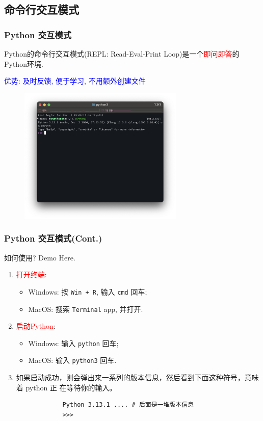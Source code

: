 \documentclass[handout]{ctexbeamer}
\begin{document}
        \subsection{命令行交互模式}
        \begin{frame}
            \frametitle{Python 交互模式}
            Python的命令行交互模式(REPL: Read-Eval-Print Loop)是一个\textcolor{red}{即问即答}的Python环境. 

            \textcolor{blue}{优势: 及时反馈, 便于学习, 不用额外创建文件}
            \begin{figure}[htpb]
                \centering
                \includegraphics[width=0.7\textwidth]{./images/terminal.png}
            \end{figure}
        \end{frame}

        \begin{frame}[fragile]
            \frametitle{Python 交互模式(Cont.)}
            如何使用? Demo Here.
            \begin{enumerate}
                \item \textcolor{red}{打开终端}:
                \begin{itemize}
                    \item Windows: 按 \texttt{Win + R}, 输入 \texttt{cmd} 回车;
                    \item MacOS: 搜索 \texttt{Terminal} app, 并打开.
                \end{itemize}  
                \item \textcolor{red}{启动Python}: 
                \begin{itemize}
                    \item Windows: 输入 \texttt{python} 回车;
                    \item MacOS: 输入 \texttt{python3} 回车.
                \end{itemize}
                \item 如果启动成功，则会弹出来一系列的版本信息，然后看到下面这种符号，意味着 python 正
                在等待你的输入。
            \end{enumerate}
            \begin{verbatim}
                Python 3.13.1 .... # 后面是一堆版本信息
                >>> 
            \end{verbatim}
        \end{frame}
\end{document}
